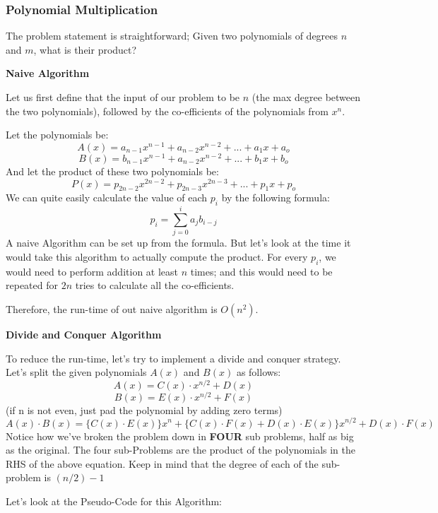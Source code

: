 \documentclass{article}
\theoremstyle{definition}
\theoremstyle{example}
\begin{document}
\subsubsection*{\Large Polynomial Multiplication}
The problem statement is straightforward; Given two polynomials of degrees $n$ and $m$, what is their product?\par
\vspace{4mm}
\noindent \textbf{Naive Algorithm}\par
\vspace{2mm}
Let us first define that the input of our problem to be $n$ (the max degree between the two polynomials), followed by the co-efficients of the polynomials from $x^{n}$.\par
\vspace{4mm}
Let the polynomials be: \[A(x) = a_{n-1}x^{n-1} + a_{n-2}x^{n-2} + ... + a_1x + a_o\]\[B(x) = b_{n-1}x^{n-1} + a_{n-2}x^{n-2} + ... + b_1x + b_o\]
And let the product of these two polynomials be: \[P(x) = p_{2n-2}x^{2n-2} + p_{2n-3}x^{2n-3} + ... + p_1x + p_o\]
We can quite easily calculate the value of each $p_i$ by the following formula:
\[p_i = \sum_{j=0}^{i} a_jb_{i-j}\]
A naive Algorithm can be set up from the formula. But let's look at the time it would take this algorithm to actually compute the product. For every $p_i$, we would need to perform addition at least $n$ times; and this would need to be repeated for $2n$ tries to calculate all the co-efficients.\par
\vspace{4mm}
Therefore, the run-time of out naive algorithm is \textbf{\(O(n^2)\)}.\par
\vspace{4mm}
\noindent \textbf{Divide and Conquer Algorithm} \par
\vspace{4mm}
To reduce the run-time, let's try to implement a divide and conquer strategy. Let's split the given polynomials $A(x)$ and $B(x)$ as follows:
\[A(x) = C(x)\cdot x^{n/2} + D(x)\] \[B(x) = E(x)\cdot x^{n/2} + F(x)\]
(if n is not even, just pad the polynomial by adding zero terms)
\[A(x)\cdot B(x) = \{C(x)\cdot E(x)\}x^n + \{C(x)\cdot F(x) + D(x)\cdot E(x)\}x^{n/2} + D(x)\cdot F(x)\]
Notice how we've broken the problem down in \textbf{FOUR} sub problems, half as big as the original. The four sub-Problems are the product of the polynomials in the RHS of the above equation. Keep in mind that the degree of each of the sub-problem is $(n/2)-1$\par
\newpage
\noindent Let's look at the Pseudo-Code for this Algorithm:\par
\end{document}
